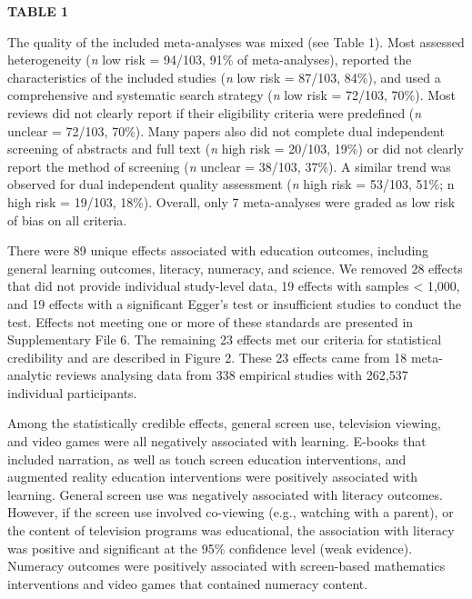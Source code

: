 \documentclass[
  english,
  man]{apa6}
\begin{document}
\textbf{TABLE 1}

The quality of the included meta-analyses was mixed (see Table 1).
Most assessed heterogeneity (\emph{n} low risk = 94/103, 91\% of meta-analyses), reported the characteristics of the included studies (\emph{n} low risk = 87/103, 84\%), and used a comprehensive and systematic search strategy (\emph{n} low risk = 72/103, 70\%).
Most reviews did not clearly report if their eligibility criteria were predefined (\emph{n} unclear = 72/103, 70\%).
Many papers also did not complete dual independent screening of abstracts and full text (\emph{n} high risk = 20/103, 19\%) or did not clearly report the method of screening (\emph{n} unclear = 38/103, 37\%).
A similar trend was observed for dual independent quality assessment (\emph{n} high risk = 53/103, 51\%; n high risk = 19/103, 18\%).
Overall, only 7 meta-analyses were graded as low risk of bias on all criteria.

There were 89 unique effects associated with education outcomes, including general learning outcomes, literacy, numeracy, and science.
We removed 28 effects that did not provide individual study-level data, 19 effects with samples \textless{} 1,000, and 19 effects with a significant Egger's test or insufficient studies to conduct the test.
Effects not meeting one or more of these standards are presented in Supplementary File 6.
The remaining 23 effects met our criteria for statistical credibility and are described in Figure 2.
These 23 effects came from 18 meta-analytic reviews analysing data from 338 empirical studies with 262,537 individual participants.

Among the statistically credible effects, general screen use, television viewing, and video games were all negatively associated with learning.
E-books that included narration, as well as touch screen education interventions, and augmented reality education interventions were positively associated with learning.
General screen use was negatively associated with literacy outcomes.
However, if the screen use involved co-viewing (e.g., watching with a parent), or the content of television programs was educational, the association with literacy was positive and significant at the 95\% confidence level (weak evidence).
Numeracy outcomes were positively associated with screen-based mathematics interventions and video games that contained numeracy content.
\end{document}
